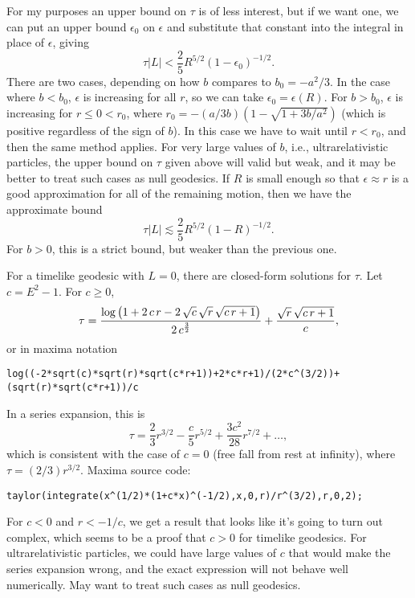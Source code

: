 \documentclass{article}
\begin{document}
For my purposes an upper bound on $\tau$ is of less interest, but if we want one,
we can put an upper bound $\epsilon_0$ on $\epsilon$ and substitute that
constant into the integral in place of $\epsilon$, giving
\begin{equation*}
  \tau|L| < \frac{2}{5}R^{5/2}(1-\epsilon_0)^{-1/2}.
\end{equation*}
There are two cases, depending on how $b$ compares to
$b_0=-a^2/3$. In the case where $b<b_0$, $\epsilon$ is increasing for all $r$, so we can
take $\epsilon_0=\epsilon(R)$. For $b>b_0$, $\epsilon$ is increasing for $r\le 0<r_0$,
where $r_0=-(a/3b)(1-\sqrt{1+3b/a^2})$ (which is positive regardless of the sign of $b$).
In this case we have to wait until $r<r_0$, and then the same method applies.
For very large values of $b$, i.e., ultrarelativistic particles, the upper bound on
$\tau$ given above will valid but weak, and it may be better to treat such cases as null geodesics.
If $R$ is small enough so that $\epsilon\approx r$ is a good approximation for all of
the remaining motion, then we have the approximate bound
\begin{equation*}
  \tau|L| \lesssim \frac{2}{5}R^{5/2}(1-R)^{-1/2}.
\end{equation*}
For $b>0$, this is a strict bound, but weaker than the previous one.

For a timelike geodesic with $L=0$, there are closed-form solutions for $\tau$. Let $c=E^2-1$.
For $c \ge 0$,
\begin{equation*}
\tau = {{\log \left(1+2\,c\,r-2\,\sqrt{c}\,\sqrt{r}\,\sqrt{c\,r+1}\right)
 }\over{2\,c^{{{3}\over{2}}}}}+{{\sqrt{r}\,\sqrt{c\,r+1}}\over{c}},
\end{equation*}
or in maxima notation
\begin{verbatim}
log((-2*sqrt(c)*sqrt(r)*sqrt(c*r+1))+2*c*r+1)/(2*c^(3/2))+(sqrt(r)*sqrt(c*r+1))/c
\end{verbatim}
In a series expansion, this is
\begin{equation*}
  \tau = \frac{2}{3}r^{3/2}-\frac{c}{5}r^{5/2}+\frac{3c^2}{28}r^{7/2}+\ldots,
\end{equation*}
which is consistent with the case of
$c=0$ (free fall from rest at infinity), where $\tau=(2/3)r^{3/2}$.
Maxima source code:
\begin{verbatim}
taylor(integrate(x^(1/2)*(1+c*x)^(-1/2),x,0,r)/r^(3/2),r,0,2);
\end{verbatim}
For $c<0$ and $r<-1/c$, we get a result that looks like it's going to turn out
complex, which seems to be a proof that $c>0$ for timelike geodesics.
For ultrarelativistic particles, we could have large values of $c$ that would
make the series expansion wrong, and the exact expression will not behave well
numerically. May want to treat such cases as null geodesics.
\end{document}
